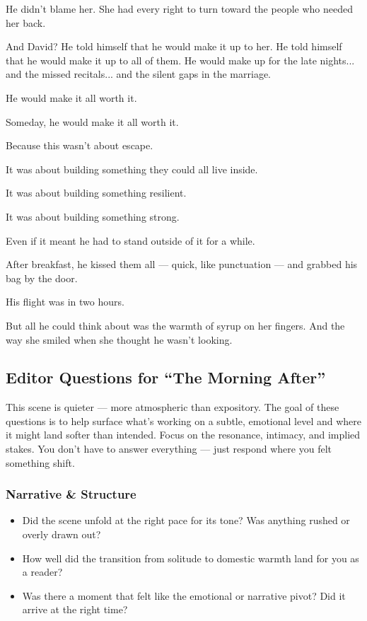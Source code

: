 He didn’t blame her. 
She had every right to turn toward the people who needed her back.

And David? 
He told himself that he would make it up to her. 
He told himself that he would make it up to all of them.
He would make up for the late nights... and the missed recitals... and the silent gaps in the marriage.

He would make it all worth it.

Someday, he would make it all worth it.

Because this wasn’t about escape. 

It was about building something they could all live inside.

It was about building something resilient. 

It was about building something strong.

Even if it meant he had to stand outside of it for a while.

After breakfast, he kissed them all --- quick, like punctuation --- and grabbed his bag by the door.

His flight was in two hours.

But all he could think about was the warmth of syrup on her fingers.
And the way she smiled when she thought he wasn’t looking.


\subsection*{Editor Questions for ``The Morning After''}

This scene is quieter — more atmospheric than expository. The goal of these questions is to help surface what’s working on a subtle, emotional level and where it might land softer than intended. Focus on the resonance, intimacy, and implied stakes. You don’t have to answer everything — just respond where you felt something shift.

\subsubsection*{Narrative \& Structure}

\begin{itemize}
  \item Did the scene unfold at the right pace for its tone? Was anything rushed or overly drawn out?
  \item How well did the transition from solitude to domestic warmth land for you as a reader?
  \item Was there a moment that felt like the emotional or narrative pivot? Did it arrive at the right time?
\end{itemize}

